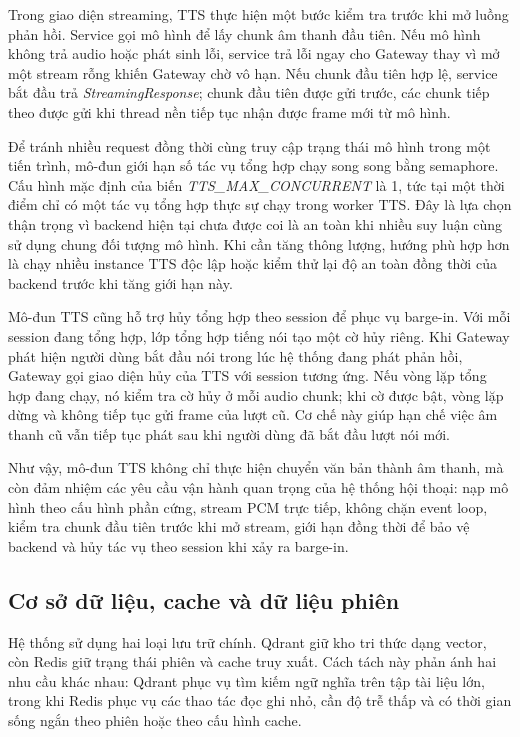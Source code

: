 \documentclass[a4paper,13pt,twoside]{report}
\begin{document}
Trong giao diện streaming, TTS thực hiện một bước kiểm tra trước khi mở luồng phản hồi. Service gọi mô hình để lấy chunk âm thanh đầu tiên. Nếu mô hình không trả audio hoặc phát sinh lỗi, service trả lỗi ngay cho Gateway thay vì mở một stream rỗng khiến Gateway chờ vô hạn. Nếu chunk đầu tiên hợp lệ, service bắt đầu trả \textit{StreamingResponse}; chunk đầu tiên được gửi trước, các chunk tiếp theo được gửi khi thread nền tiếp tục nhận được frame mới từ mô hình.

Để tránh nhiều request đồng thời cùng truy cập trạng thái mô hình trong một tiến trình, mô-đun giới hạn số tác vụ tổng hợp chạy song song bằng semaphore. Cấu hình mặc định của biến \textit{TTS\_MAX\_CONCURRENT} là 1, tức tại một thời điểm chỉ có một tác vụ tổng hợp thực sự chạy trong worker TTS. Đây là lựa chọn thận trọng vì backend hiện tại chưa được coi là an toàn khi nhiều suy luận cùng sử dụng chung đối tượng mô hình. Khi cần tăng thông lượng, hướng phù hợp hơn là chạy nhiều instance TTS độc lập hoặc kiểm thử lại độ an toàn đồng thời của backend trước khi tăng giới hạn này.

Mô-đun TTS cũng hỗ trợ hủy tổng hợp theo session để phục vụ barge-in. Với mỗi session đang tổng hợp, lớp tổng hợp tiếng nói tạo một cờ hủy riêng. Khi Gateway phát hiện người dùng bắt đầu nói trong lúc hệ thống đang phát phản hồi, Gateway gọi giao diện hủy của TTS với session tương ứng. Nếu vòng lặp tổng hợp đang chạy, nó kiểm tra cờ hủy ở mỗi audio chunk; khi cờ được bật, vòng lặp dừng và không tiếp tục gửi frame của lượt cũ. Cơ chế này giúp hạn chế việc âm thanh cũ vẫn tiếp tục phát sau khi người dùng đã bắt đầu lượt nói mới.

Như vậy, mô-đun TTS không chỉ thực hiện chuyển văn bản thành âm thanh, mà còn đảm nhiệm các yêu cầu vận hành quan trọng của hệ thống hội thoại: nạp mô hình theo cấu hình phần cứng, stream PCM trực tiếp, không chặn event loop, kiểm tra chunk đầu tiên trước khi mở stream, giới hạn đồng thời để bảo vệ backend và hủy tác vụ theo session khi xảy ra barge-in.

\subsection{Cơ sở dữ liệu, cache và dữ liệu phiên}

Hệ thống sử dụng hai loại lưu trữ chính. Qdrant giữ kho tri thức dạng vector, còn Redis giữ trạng thái phiên và cache truy xuất. Cách tách này phản ánh hai nhu cầu khác nhau: Qdrant phục vụ tìm kiếm ngữ nghĩa trên tập tài liệu lớn, trong khi Redis phục vụ các thao tác đọc ghi nhỏ, cần độ trễ thấp và có thời gian sống ngắn theo phiên hoặc theo cấu hình cache.
\end{document}

